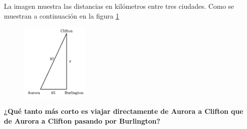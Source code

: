 La imagen muestra las distancias en kilómetros entre tres ciudades.
Como se muestran a continuación en la figura \ref{fig:proverb_pitagoras_04}
\begin{figure}[H]
    \begin{center}
        \includegraphics[width=0.3\textwidth]{../images/proverb_pitagoras_04.png}
    \end{center}
    \caption{}
    \label{fig:proverb_pitagoras_04}
\end{figure}
\textbf{¿Qué tanto más corto es viajar directamente de Aurora a Clifton que de Aurora a Clifton pasando por Burlington?}